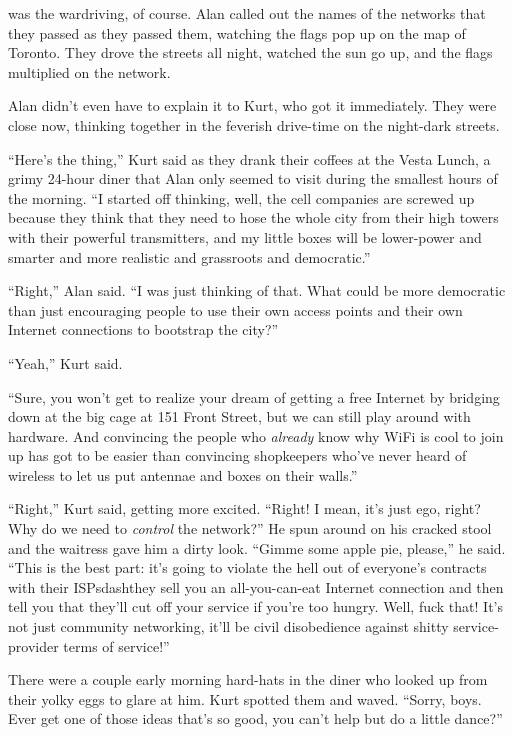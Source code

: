  was the wardriving, of course.  Alan called out the names of the
networks that they passed as they passed them, watching the flags pop
up on the map of Toronto.  They drove the streets all night, watched
the sun go up, and the flags multiplied on the network.

Alan didn't even have to explain it to Kurt, who got it immediately. 
They were close now, thinking together in the feverish drive-time on
the night-dark streets.

``Here's the thing,'' Kurt said as they drank their coffees at the
Vesta Lunch, a grimy 24-hour diner that Alan only seemed to visit
during the smallest hours of the morning.  ``I started off thinking,
well, the cell companies are screwed up because they think that they
need to hose the whole city from their high towers with their powerful
transmitters, and my little boxes will be lower-power and smarter and
more realistic and grassroots and democratic.''

``Right,'' Alan said.  ``I was just thinking of that.  What could be
more democratic than just encouraging people to use their own access
points and their own Internet connections to bootstrap the city?''

``Yeah,'' Kurt said.

``Sure, you won't get to realize your dream of getting a free Internet
by bridging down at the big cage at 151 Front Street, but we can still
play around with hardware.  And convincing the people who
\textit{already} know why WiFi is cool to join up has got to be easier
than convincing shopkeepers who've never heard of wireless to let us
put antennae and boxes on their walls.''

``Right,'' Kurt said, getting more excited.  ``Right!  I mean, it's
just ego, right?  Why do we need to \textit{control} the network?'' He
spun around on his cracked stool and the waitress gave him a dirty
look.  ``Gimme some apple pie, please,'' he said.  ``This is the best
part:  it's going to violate the hell out of everyone's contracts with
their ISPsdash{}they sell you an all-you-can-eat Internet connection and
then tell you that they'll cut off your service if you're too hungry. 
Well, fuck that!  It's not just community networking, it'll be civil
disobedience against shitty service-provider terms of service!''

There were a couple early morning hard-hats in the diner who looked up
from their yolky eggs to glare at him.  Kurt spotted them and waved. 
``Sorry, boys.  Ever get one of those ideas that's so good, you can't
help but do a little dance?''

